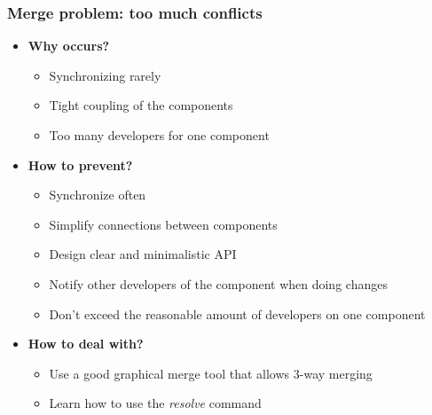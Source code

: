 \documentclass{beamer}
\begin{document}
\begin{frame}
\frametitle{Merge problem: too much conflicts}
\begin{itemize}
\item \textbf{Why occurs?}
\begin{itemize}
\item Synchronizing rarely
\item Tight coupling of the components
\item Too many developers for one component
\end{itemize}
\item \textbf{How to prevent?}
\begin{itemize}
\item Synchronize often
\item Simplify connections between components
\item Design clear and minimalistic API
\item Notify other developers of the component when doing changes
\item Don't exceed the reasonable amount of developers on one component 
\end{itemize}
\item \textbf{How to deal with?}
\begin{itemize}
\item Use a good graphical merge tool that allows 3-way merging
\item Learn how to use the \textit{resolve} command
\end{itemize}
\end{itemize}
\end{frame}
\end{document}
